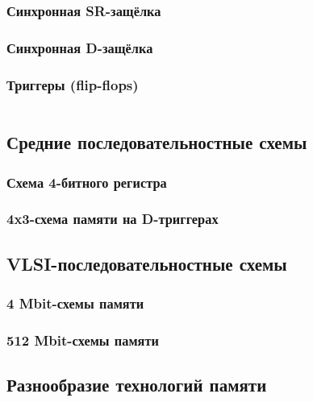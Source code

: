 \begin{frame}
\frametitle{Синхронная SR-защёлка}
\end{frame}

\begin{frame}
\frametitle{Синхронная D-защёлка}
\end{frame}


\begin{frame}
\frametitle{Триггеры (flip-flops)}\vspace{-.7cm}
\begin{columns}
    \column{5cm} \pause{}
    \column{7cm} \pause{}
\end{columns}
\end{frame}

\subsection{Средние последовательностные схемы}

\begin{frame}
\frametitle{Схема 4-битного регистра}
\end{frame}

\begin{frame}[plain]
\frametitle{4x3-схема памяти на D-триггерах}
\end{frame}

\subsection{VLSI-последовательностные схемы}

\begin{frame}
\frametitle{4 Mbit-схемы памяти}
\end{frame}

\begin{frame}
\frametitle{512 Mbit-схемы памяти}
\end{frame}

\subsection{Разнообразие технологий памяти}

